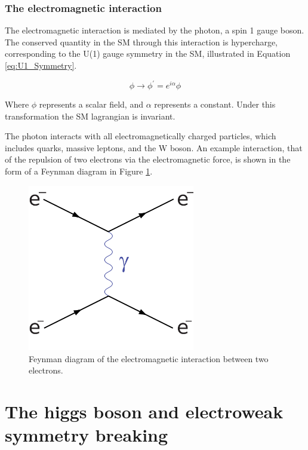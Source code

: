 \subsubsection{The electromagnetic interaction}

The electromagnetic interaction is mediated by the photon, a spin 1 gauge boson. The conserved quantity in the SM through this interaction is hypercharge, corresponding to the U(1) gauge symmetry in the SM, illustrated in Equation \ref{eq:U1_Symmetry}. 

\begin{equation} \label{eq:U1_Symmetry}
    \phi\rightarrow\phi^{\prime}=e^{i\alpha}\phi
\end{equation}

Where $\phi$ represents a scalar field, and $\alpha$ represents a constant. Under this transformation the SM lagrangian is invariant.

The photon interacts with all electromagnetically charged particles, which includes quarks, massive leptons, and the W boson. An example interaction, that of the repulsion of two electrons via the electromagnetic force, is shown in the form of a Feynman diagram in Figure \ref{fig:EM_FD}.

\begin{figure}[H]
    \centering
    \includegraphics[width=0.65\textwidth]{Images/Theory/EM_FD.png}
    \caption{Feynman diagram of the electromagnetic interaction between two electrons.}
    \label{fig:EM_FD}
\end{figure}

\section{The higgs boson and electroweak symmetry breaking} \label{sec:Higgs}

